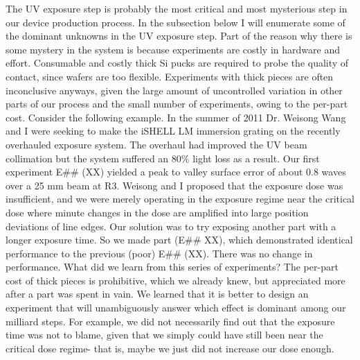The UV exposure step is probably the most critical and most mysterious step in our device production process.  In the subsection below I will enumerate some of the dominant unknowns in the UV exposure step.  Part of the reason why there is some mystery in the system is because experiments are costly in hardware and effort.  Consumable and costly thick Si pucks are required to probe the quality of contact, since wafers are too flexible.  Experiments with thick pieces are often inconclusive anyways, given the large amount of uncontrolled variation in other parts of our process and the small number of experiments, owing to the per-part cost.  Consider the following example.  In the summer of 2011 Dr. Weisong Wang and I were seeking to make the iSHELL LM immersion grating on the recently overhauled exposure system.  The overhaul had improved the UV beam collimation but the system suffered an 80\% light loss as a result.  Our first experiment E\#\# (XX)  yielded a peak to valley surface error of about 0.8 waves over a 25 mm beam at R3.  Weisong and I proposed that the exposure dose was insufficient, and we were merely operating in the exposure regime near the critical dose where minute changes in the dose are amplified into large position deviations of line edges.  Our solution was to try exposing another part with a longer exposure time.  So we made part (E\#\# XX), which demonstrated identical performance to the previous (poor) E\#\# (XX).  There was no change in performance.  What did we learn from this series of experiments?  The per-part cost of thick pieces is prohibitive, which we already knew, but appreciated more after a part was spent in vain.  We learned that it is better to design an experiment that will unambiguously answer which effect is dominant among our milliard steps.  For example, we did not necessarily find out that the exposure time was not to blame, given that we simply could have still been near the critical dose regime- that is, maybe we just did not increase our dose enough.  


